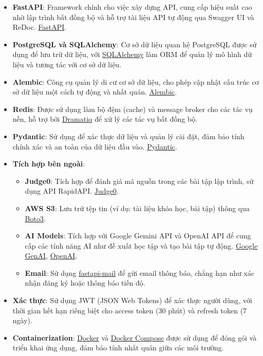\begin{itemize}
    \item \textbf{FastAPI}: Framework chính cho việc xây dựng API, cung cấp hiệu suất cao nhờ lập trình bất đồng bộ và hỗ trợ tài liệu API tự động qua Swagger UI và ReDoc. \href{https://fastapi.tiangolo.com/}{FastAPI}.
    \item \textbf{PostgreSQL và SQLAlchemy}: Cơ sở dữ liệu quan hệ PostgreSQL được sử dụng để lưu trữ dữ liệu, với \href{https://www.sqlalchemy.org/}{SQLAlchemy} làm ORM để quản lý mô hình dữ liệu và tương tác với cơ sở dữ liệu.
    \item \textbf{Alembic}: Công cụ quản lý di cư cơ sở dữ liệu, cho phép cập nhật cấu trúc cơ sở dữ liệu một cách tự động và nhất quán. \href{https://alembic.sqlalchemy.org/}{Alembic}.
    \item \textbf{Redis}: Được sử dụng làm bộ đệm (cache) và message broker cho các tác vụ nền, hỗ trợ bởi \href{https://dramatiq.io/}{Dramatiq} để xử lý các tác vụ bất đồng bộ.
    \item \textbf{Pydantic}: Sử dụng để xác thực dữ liệu và quản lý cài đặt, đảm bảo tính chính xác và an toàn của dữ liệu đầu vào. \href{https://pydantic-docs.helpmanual.io/}{Pydantic}.
    \item \textbf{Tích hợp bên ngoài}:
    \begin{itemize}
        \item \textbf{Judge0}: Tích hợp để đánh giá mã nguồn trong các bài tập lập trình, sử dụng API RapidAPI. \href{https://judge0.com/}{Judge0}.
        \item \textbf{AWS S3}: Lưu trữ tệp tin (ví dụ: tài liệu khóa học, bài tập) thông qua \href{https://boto3.amazonaws.com/v1/documentation/api/latest/index.html}{Boto3}.
        \item \textbf{AI Models}: Tích hợp với Google Gemini API và OpenAI API để cung cấp các tính năng AI như đề xuất học tập và tạo bài tập tự động. \href{https://ai.google.dev/}{Google GenAI}, \href{https://openai.com/}{OpenAI}.
        \item \textbf{Email}: Sử dụng \href{https://github.com/sabuhish/fastapi-mail}{fastapi-mail} để gửi email thông báo, chẳng hạn như xác nhận đăng ký hoặc thông báo tiến độ.
    \end{itemize}
    \item \textbf{Xác thực}: Sử dụng JWT (JSON Web Tokens) để xác thực người dùng, với thời gian hết hạn riêng biệt cho access token (30 phút) và refresh token (7 ngày).
    \item \textbf{Containerization}: \href{https://www.docker.com/}{Docker} và \href{https://docs.docker.com/compose/}{Docker Compose} được sử dụng để đóng gói và triển khai ứng dụng, đảm bảo tính nhất quán giữa các môi trường.
\end{itemize}

